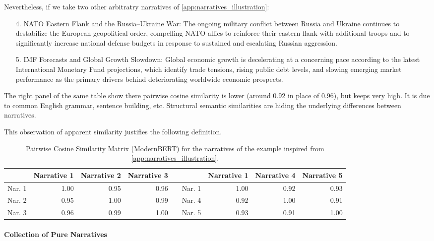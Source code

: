 \documentclass[
  journal=medium,
  manuscript=article-type,
  year=2025,
  volume=1,
]{cup-journal}
\def\narr#1{{\sc #1}}
\begin{document}
{Nevertheless, if we take two other arbitratry narratives of \ref{app:narratives_illustration}:
\begin{itemize}
    \item[4.] \narr{\small NATO Eastern Flank and the Russia–Ukraine War}: \narr{The ongoing military conflict between Russia and Ukraine continues to destabilize the European geopolitical order, compelling NATO allies to reinforce their eastern flank with additional troops and to significantly increase national defense budgets in response to sustained and escalating Russian aggression.}
    \item[5.] \narr{IMF  Forecasts  and  Global Growth Slowdown}: \narr{\small Global economic growth is decelerating at a concerning pace according to the latest International Monetary Fund projections, which identify trade tensions, rising public debt levels, and slowing emerging market performance as the primary drivers behind deteriorating worldwide economic prospects.}
\end{itemize}
The right panel of the same table show there pairwise cosine similarity is lower (around 0.92 in place of 0.96), but keeps very high. It is due to common English grammar, sentence building, etc. 
Structural semantic similarities are hiding the underlying differences between narratives.

This observation of apparent similarity justifies the following definition.
}

\begin{table}
\caption{Pairwise Cosine Similarity Matrix (ModernBERT) for the narratives of the example inspired from  \ref{app:narratives_illustration}.}
\label{tab:cosine_similarity}
\centering
\begin{tabular}{lrrr c| lrrr}
\toprule
 & Narrative 1 & Narrative 2 & Narrative 3 & \quad & & Narrative 1 & Narrative 4 & Narrative 5 \\
\midrule
Nar. 1 & 1.00 & 0.95 & 0.96 & & Nar. 1 & 1.00 & 0.92 & 0.93 \\
Nar. 2 & 0.95 & 1.00 & 0.99 & & Nar. 4 & 0.92 & 1.00 & 0.91 \\
Nar. 3 & 0.96 & 0.99 & 1.00 & & Nar. 5 & 0.93 & 0.91 & 1.00 \\
\bottomrule
\end{tabular}
\end{table}


\paragraph{Collection of Pure Narratives}
\end{document}
